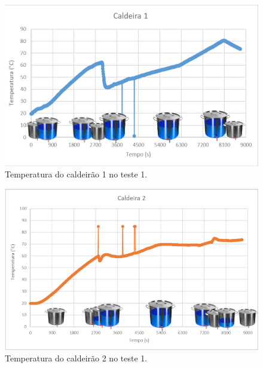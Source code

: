   \begin{figure}[htb]
	\caption{\label{teste01c1}Temperatura do caldeirão 1 no teste 1.}
	\begin{center}
	    \includegraphics[width=0.95\linewidth]{./img/teste01_cald1.jpg}
	\end{center}
\end{figure}

  \begin{figure}[htb]
	\caption{\label{teste01c2}Temperatura do caldeirão 2 no teste 1.}
	\begin{center}
	    \includegraphics[width=0.95\linewidth]{./img/teste01_cald2.jpg}
	\end{center}
\end{figure}

